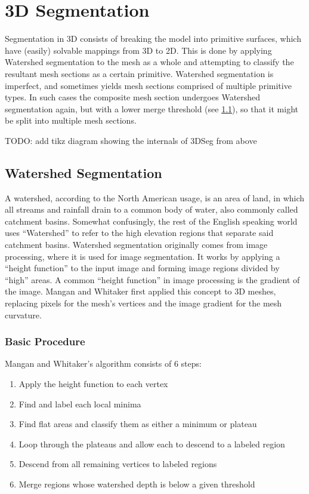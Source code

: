 \section{3D Segmentation}
Segmentation in 3D consists of breaking the model into primitive surfaces, which have (easily) solvable mappings from 3D to 2D.
This is done by applying Watershed segmentation to the mesh as a whole and attempting to classify the resultant mesh sections as a certain primitive.
Watershed segmentation is imperfect, and sometimes yields mesh sections comprised of multiple primitive types.
In such cases the composite mesh section undergoes Watershed segmentation again, but with a lower merge threshold (see \ref{ws_seg}), so that it might be split into multiple mesh sections.

TODO: add tikz diagram showing the internals of 3DSeg from above

\subsection{Watershed Segmentation}\label{ws_seg}
A watershed, according to the North American usage, is an area of land, in which all streams and rainfall drain to a common body of water\cite{USGS_Watersheds}, also commonly called catchment basins.
Somewhat confusingly, the rest of the English speaking world uses ``Watershed'' to refer to the high elevation regions that separate said catchment basins.
Watershed segmentation originally comes from image processing, where it is used for image segmentation\cite{ImageSegWS, DigitalImageProc}.
It works by applying a ``height function'' to the input image and forming image regions divided by ``high'' areas.
A common ``height function'' in image processing is the gradient of the image\cite{ImageSegWS}.
Mangan and Whitaker first applied this concept to 3D meshes, replacing pixels for the mesh's vertices and the image gradient for the mesh curvature\cite{Watershed}.

\subsubsection{Basic Procedure}
Mangan and Whitaker's algorithm consists of 6 steps:
\begin{enumerate}
	\item Apply the height function to each vertex
	\item Find and label each local minima
	\item Find flat areas and classify them as either a minimum or plateau
	\item \label{plateau_step} Loop through the plateaus and allow each to descend to a labeled region
	\item Descend from all remaining vertices to labeled regions
	\item Merge regions whose watershed depth is below a given threshold
\end{enumerate}

